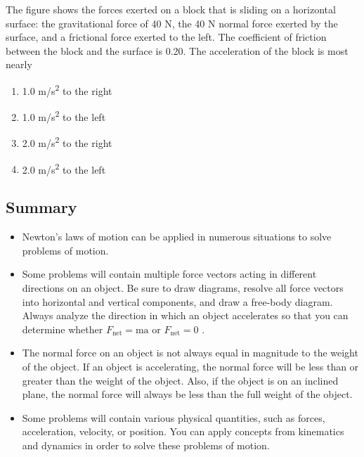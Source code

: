 \documentclass[
]{book}
\providecommand{\tightlist}{%
  \setlength{\itemsep}{0pt}\setlength{\parskip}{0pt}}
\newenvironment{ap-test-prep}{}{}
\begin{document}
\begin{ap-test-prep}
The figure shows the forces exerted on a block that is sliding on a
horizontal surface: the gravitational force of 40 N, the 40 N normal
force exerted by the surface, and a frictional force exerted to the
left. The coefficient of friction between the block and the surface is
0.20. The acceleration of the block is most nearly

\begin{enumerate}
\def\labelenumi{\alph{enumi}.}
\tightlist
\item
  1.0 m/s\textsuperscript{2} to the right
\item
  1.0 m/s\textsuperscript{2} to the left
\item
  2.0 m/s\textsuperscript{2} to the right
\item
  2.0 m/s\textsuperscript{2} to the left
\end{enumerate}

\end{ap-test-prep}

\hypertarget{fs-id1596051-summary}{}
\hypertarget{summary-5}{%
\subsection{Summary}\label{summary-5}}

\begin{itemize}
\tightlist
\item
  \protect\hypertarget{import-auto-id1586681}{}{Newton's laws of motion can be applied in numerous situations to
  solve problems of motion.}
\item
  \protect\hypertarget{import-auto-id1586684}{}{Some problems will contain multiple force vectors acting in
  different directions on an object. Be sure to draw diagrams, resolve
  all force vectors into horizontal and vertical components, and draw
  a free-body diagram. Always analyze the direction in which an object
  accelerates so that you can determine whether
  \({F_{\text{net}} = \text{ma}}{}\) or \({F_{\text{net}} = 0}{}\)
  .}
\item
  \protect\hypertarget{import-auto-id3305501}{}{The normal force on an object is not always equal in magnitude to
  the weight of the object. If an object is accelerating, the normal
  force will be less than or greater than the weight of the object.
  Also, if the object is on an inclined plane, the normal force will
  always be less than the full weight of the
  object.}
\item
  \protect\hypertarget{import-auto-id2653368}{}{Some problems will contain various physical quantities, such as
  forces, acceleration, velocity, or position. You can apply concepts
  from kinematics and dynamics in order to solve these problems of
  motion.}
\end{itemize}
\end{document}
